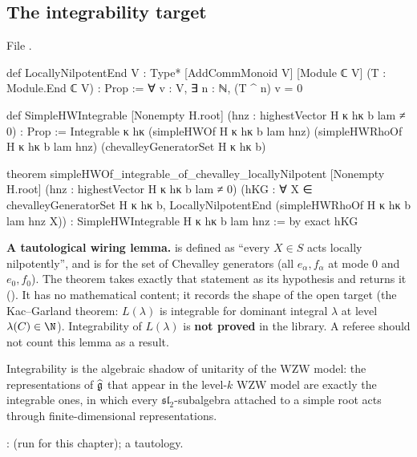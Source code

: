 \subsection{The integrability target}

File .
\begin{leancode}
def LocallyNilpotentEnd {V : Type*} [AddCommMonoid V] [Module ℂ V]
    (T : Module.End ℂ V) : Prop :=
  ∀ v : V, ∃ n : ℕ, (T ^ n) v = 0

def SimpleHWIntegrable [Nonempty H.root] (hnz : highestVector H κ hκ b lam ≠ 0) : Prop :=
  Integrable κ hκ (simpleHWOf H κ hκ b lam hnz) (simpleHWRhoOf H κ hκ b lam hnz)
    (chevalleyGeneratorSet H κ hκ b)

theorem simpleHWOf_integrable_of_chevalley_locallyNilpotent [Nonempty H.root]
    (hnz : highestVector H κ hκ b lam ≠ 0)
    (hKG : ∀ X ∈ chevalleyGeneratorSet H κ hκ b,
      LocallyNilpotentEnd (simpleHWRhoOf H κ hκ b lam hnz X)) :
    SimpleHWIntegrable H κ hκ b lam hnz := by
  exact hKG
\end{leancode}

\begin{warning}
\textbf{A tautological wiring lemma.}  is defined as ``every $X\in S$ acts locally
nilpotently'', and \allowbreak{} is  for the set of Chevalley generators
(all $e_\alpha,f_\alpha$ at mode $0$ and $e_0,f_0$). The theorem
\allowbreak{}\allowbreak{}\allowbreak{}\allowbreak{} takes exactly that statement as its
hypothesis  and returns it (). It has no mathematical content; it records the
shape of the open target (the Kac--Garland theorem: $L(\lambda)$ is integrable for dominant integral
$\lambda$ at level $\lambda(C)\in\N$). Integrability of $L(\lambda)$ is \textbf{not proved} in the library. A
referee should not count this lemma as a result.
\end{warning}

\begin{physics}
Integrability is the algebraic shadow of unitarity of the WZW model: the representations of
$\widehat{\mathfrak{g}}$ that appear in the level-$k$ WZW model are exactly the integrable ones, in which every
$\mathfrak{sl}_2$-subalgebra attached to a simple root acts through finite-dimensional representations.
\end{physics}

\begin{status}
\allowbreak{}\allowbreak{}\allowbreak{}\allowbreak{}\allowbreak{}\allowbreak{}:
 (run for this chapter); a tautology.
\end{status}

